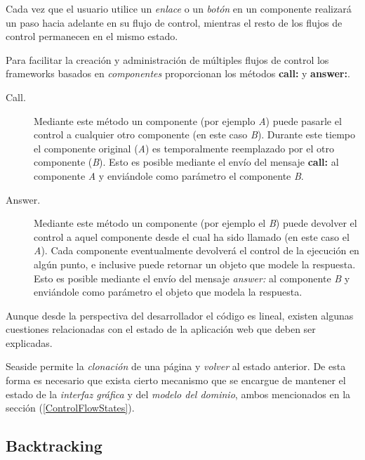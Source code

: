 Cada vez que el usuario utilice un \emph{enlace} o un \emph{botón} en un componente realizará un paso hacia adelante en su flujo de control, mientras el resto de los flujos de control permanecen en el mismo estado.

Para facilitar la creación y administración de múltiples flujos de control los frameworks basados en \emph{componentes} proporcionan los métodos \textbf{call:} y \textbf{answer:}.

\begin{description}

\item[Call.]

Mediante este método un componente (por ejemplo \emph{A}) puede pasarle el control a cualquier otro componente (en este caso \emph{B}). Durante este tiempo el componente original (\emph{A}) es temporalmente reemplazado por el otro componente (\emph{B}). Esto es posible mediante el envío del mensaje \textbf{call:} al componente \emph{A} y enviándole como parámetro el componente \emph{B}.

\item[Answer.]

Mediante este método un componente (por ejemplo el \emph{B}) puede devolver el control a aquel componente desde el cual ha sido llamado (en este caso el \emph{A}). Cada componente eventualmente devolverá el control de la ejecución en algún punto, e inclusive puede retornar un objeto que modele la respuesta. Esto es posible mediante el envío del mensaje \emph{answer:} al componente \emph{B} y enviándole como parámetro el objeto que modela la respuesta.

\end{description}

Aunque desde la perspectiva del desarrollador el código es lineal, existen algunas cuestiones relacionadas con el estado de la aplicación web que deben ser explicadas.

Seaside permite la \emph{clonación} de una página y \emph{volver} al estado anterior. De esta forma es necesario que exista cierto mecanismo que se encargue de mantener el estado de la \emph{interfaz gráfica} y del \emph{modelo del dominio}, ambos mencionados en la sección  (\ref{ControlFlowStates}).


\subsection{Backtracking}

